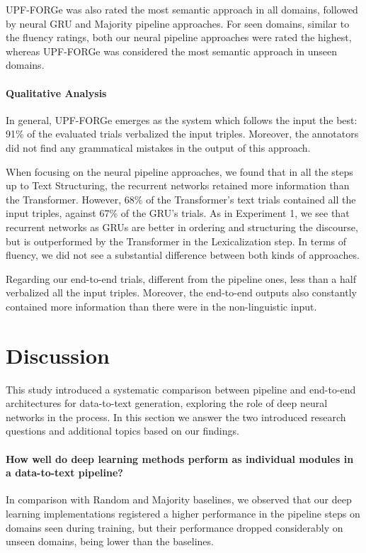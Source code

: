\documentclass[11pt,a4paper]{article}
\begin{document}
UPF-FORGe was also rated the most semantic approach in all domains, followed by neural GRU and Majority pipeline approaches. For seen domains, similar to the fluency ratings, both our neural pipeline approaches were rated the highest, whereas UPF-FORGe was considered the most semantic approach in unseen domains.

\paragraph{Qualitative Analysis} In general, UPF-FORGe emerges as the system which follows the input the best: 91\% of the evaluated trials verbalized the input triples. Moreover, the annotators did not find any grammatical mistakes in the output of this approach.

When focusing on the neural pipeline approaches, we found that in all the steps up to Text Structuring, the recurrent networks retained more information than the Transformer. However, 68\% of the Transformer's text trials contained all the input triples, against 67\% of the GRU's trials. As in Experiment 1, we see that recurrent networks as GRUs are better in ordering and structuring the discourse, but is outperformed by the Transformer in the Lexicalization step. In terms of fluency, we did not see a substantial difference between both kinds of approaches.

Regarding our end-to-end trials, different from the pipeline ones, less than a half verbalized all the input triples. Moreover, the end-to-end outputs also constantly contained more information than there were in the non-linguistic input. 

\section{Discussion}

This study introduced a systematic comparison between pipeline and end-to-end architectures for data-to-text generation, exploring the role of deep neural networks in the process. In this section we answer the two introduced research questions and additional topics based on our findings.

\paragraph{How well do deep learning methods perform as individual modules in a data-to-text pipeline?} In comparison with Random and Majority baselines, we observed that our deep learning implementations registered a higher performance in the pipeline steps on domains seen during training, but their performance dropped considerably on unseen domains, being lower than the baselines.
\end{document}
